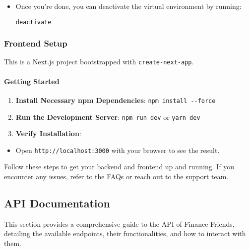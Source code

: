 \begin{itemize}
\item
  Once you're done, you can deactivate the virtual environment by
  running:

\begin{verbatim}
deactivate
\end{verbatim}
\end{itemize}

\hypertarget{frontend-setup}{%
\subsubsection{Frontend Setup}\label{frontend-setup}}

This is a Next.js project bootstrapped with \texttt{create-next-app}.

\hypertarget{getting-started-1}{%
\paragraph{Getting Started}\label{getting-started-1}}

\begin{enumerate}
\def\labelenumi{\arabic{enumi}.}
\item
  \textbf{Install Necessary npm Dependencies}:
  \texttt{npm\ install\ -\/-force}
\item
  \textbf{Run the Development Server}: \texttt{npm\ run\ dev} or
  \texttt{yarn\ dev}
\item
  \textbf{Verify Installation}:
\end{enumerate}

\begin{itemize}
\tightlist
\item
  Open \texttt{http://localhost:3000} with your browser to see the
  result.
\end{itemize}

Follow these steps to get your backend and frontend up and running. If
you encounter any issues, refer to the FAQs or reach out to the support
team.

\hypertarget{api-documentation}{%
\subsection{API Documentation}\label{api-documentation}}

This section provides a comprehensive guide to the API of Finance
Friends, detailing the available endpoints, their functionalities, and
how to interact with them.

